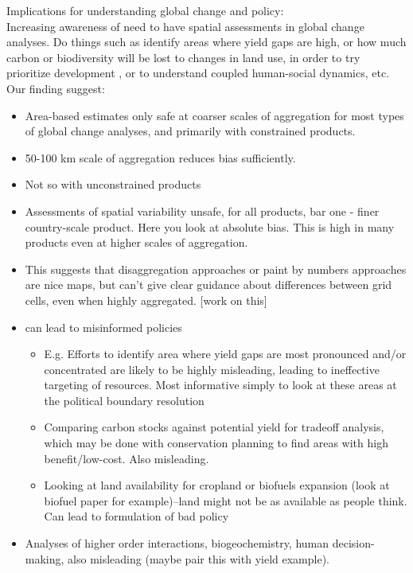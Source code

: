 \documentclass{pnastwo}
\begin{document}
\begin{article}
Implications for understanding global change and policy: \\

Increasing awareness of need to have spatial assessments in global change analyses. Do things such as identify areas where yield gaps are high, or how much carbon or biodiversity will be lost to changes in land use, in order to try prioritize development \cite{searchinger_high_2015,newbold_global_2015}, or to understand coupled human-social dynamics, etc. \\

Our finding suggest:

\begin{itemize}
  \item Area-based estimates only safe at coarser scales of aggregation for most types of global change analyses, and primarily with constrained products. 
  \item 50-100 km scale of aggregation reduces bias sufficiently.
  \item Not so with unconstrained products
  \item Assessments of spatial variability unsafe, for all products, bar one - finer country-scale product.  Here you look at absolute bias. This is high in many products even at higher scales of aggregation. 
  \item This suggests that disaggregation approaches or paint by numbers approaches are nice maps, but can't give clear guidance about differences between grid cells, even when highly aggregated.  [work on this] 
  \item can lead to misinformed policies
  \begin{itemize}
    \item E.g. Efforts to identify area where yield gaps are most pronounced and/or concentrated are likely to be highly misleading, leading to ineffective targeting of resources. Most informative simply to look at these areas at the political boundary resolution
    \item Comparing carbon stocks against potential yield for tradeoff analysis, which may be done with conservation planning to find areas with high benefit/low-cost. Also misleading. 
    \item Looking at land availability for cropland or biofuels expansion (look at biofuel paper for example)--land might not be as available as people think. Can lead to formulation of bad policy
    \end{itemize}
  \item Analyses of higher order interactions, biogeochemistry, human decision-making, also misleading (maybe pair this with yield example). 

\end{itemize}
\end{article}
\end{document}

